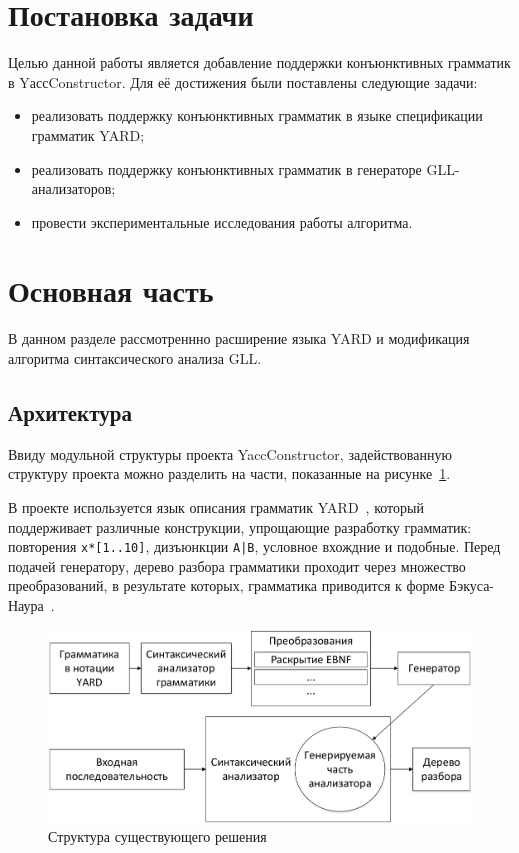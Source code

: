 \documentclass[14pt]{matmex-diploma}
\begin{document}
\section{Постановка задачи}

Целью данной работы является добавление поддержки конъюнктивных грамматик в YассConstructor. Для её достижения были поставлены следующие задачи:

\begin{itemize}
    \item реализовать поддержку конъюнктивных грамматик в языке спецификации грамматик YARD;
    \item реализовать поддержку конъюнктивных грамматик в генераторе GLL-анализаторов;
    \item провести экспериментальные исследования работы алгоритма.
\end{itemize}


\section{Основная часть}

В данном разделе рассмотреннно расширение языка YARD и модификация алгоритма синтаксического анализа GLL.


\subsection{Архитектура}

Ввиду модульной структуры проекта YaccConstructor, задействованную структуру проекта можно разделить на части, показанные на рисунке~\ref{project_structure}.

В проекте используется язык описания грамматик YARD~\cite{YARD}, который поддерживает различные конструкции, упрощающие разработку грамматик: повторения \verb|x*[1..10]|, дизъюнкции \texttt{A|B}, условное вхождние и подобные. Перед подачей генератору, дерево разбора грамматики проходит через множество преобразований, в результате которых, грамматика приводится к форме Бэкуса-Наура~\cite{BNF}.

\begin{figure}[h]
\centering
\includegraphics[width=15cm]{courseworkpictures/img2.pdf}
\caption{Структура существующего решения}
\label{project_structure}
\end{figure}
\end{document}

